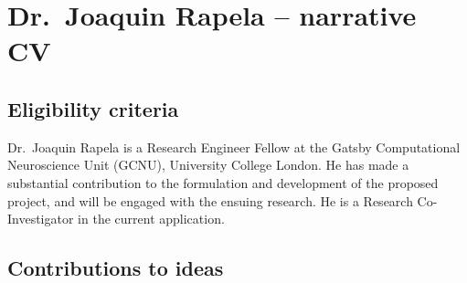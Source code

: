 % 
% 
% 
% 
% 
%

\section{Dr.\ Joaquin Rapela -- narrative CV}



\subsection{Eligibility criteria}

Dr.~Joaquin Rapela is a Research Engineer Fellow at the Gatsby Computational
Neuroscience Unit (GCNU), University College London.
%
He has made a substantial contribution to the formulation and development of
the proposed project, and will be engaged with the ensuing research. He is a
Research Co-Investigator in the current application.

% 

\subsection{Contributions to ideas}

